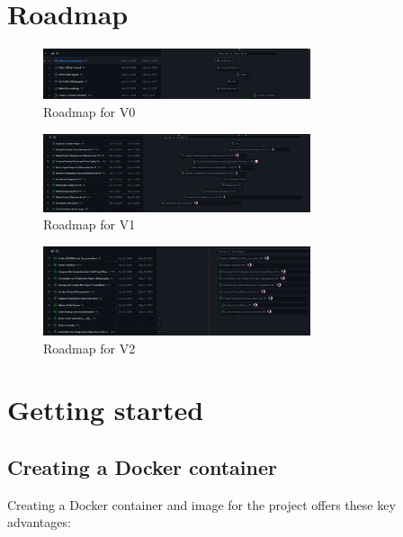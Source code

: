 \documentclass[12pt]{article}
\begin{document}

\newpage
\section{Roadmap}
\begin{figure}[H]
    \centering
    \includegraphics[width=0.7\textwidth]{images/roadmapV0.png}
    \caption{Roadmap for V0}
\end{figure}

\begin{figure}[H]
    \centering
    \includegraphics[width=0.7\textwidth]{images/roadmapV1.png}
    \caption{Roadmap for V1}
\end{figure}

\begin{figure}[H]
    \centering
    \includegraphics[width=0.7\textwidth]{images/roadmapV2.png}
    \caption{Roadmap for V2}
\end{figure}

\newpage
\section{Getting started}  

\subsection{Creating a Docker container}
Creating a Docker container and image for the project offers these key advantages:
\end{document}
